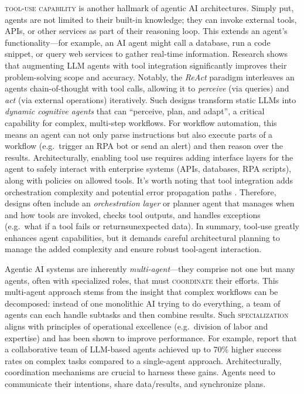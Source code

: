 \textsc{tool-use capability} is another hallmark of agentic AI architectures. Simply put, agents are not limited to their built-in knowledge; they can invoke external tools, APIs, or other services as part of their reasoning loop. This extends an agent's functionality---for example, an AI agent might call a database, run a code snippet, or query web services to gather real-time information. Research shows that augmenting LLM agents with tool integration significantly improves their problem-solving scope and accuracy. Notably, the \emph{ReAct} paradigm interleaves an agents chain-of-thought with tool calls, allowing it to \emph{perceive} (via queries) and \emph{act} (via external operations) iteratively. Such designs transform static LLMs into \emph{dynamic cognitive agents} that can “perceive, plan, and adapt”, a critical capability for complex, multi-step workflows. For workflow automation, this means an agent can not only parse instructions but also execute parts of a workflow (e.g.~trigger an RPA bot or send an alert) and then reason over the results. Architecturally, enabling tool use requires adding interface layers for the agent to safely interact with enterprise systems (APIs, databases, RPA scripts), along with policies on allowed tools. It's worth noting that tool integration adds orchestration complexity and potential error propagation paths \parencite{sapkotaAI2026}. Therefore, designs often include an \emph{orchestration layer} or planner agent that manages when and how tools are invoked, checks tool outputs, and handles exceptions (e.g.~what if a tool fails or returnsunexpected data). In summary, tool-use greatly enhances agent capabilities, but it demands careful architectural planning to manage the added complexity and ensure robust tool-agent interaction. 

Agentic AI systems are inherently \emph{multi-agent}---they comprise not one but many agents, often with specialized roles, that must \textsc{coordinate} their efforts. This multi-agent approach stems from the insight that complex workflows can be decomposed: instead of one monolithic AI trying to do everything, a team of agents can each handle subtasks and then combine results. Such \textsc{specialization} aligns with principles of operational excellence (e.g.~division of labor and expertise) and has been shown to improve performance. For example, \textcite{shuEffective2024} report that a collaborative team of LLM-based agents achieved up to 70\% higher success rates on complex tasks compared to a single-agent approach. Architecturally, coordination mechanisms are crucial to harness these gains. Agents need to communicate their intentions, share data/results, and synchronize plans.

